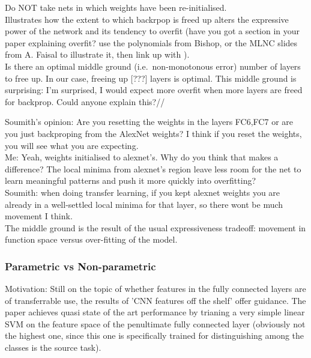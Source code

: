 \documentclass[a4paper,11pt]{article}
\begin{document}
Do NOT take nets in which weights have been re-initialised. \\


Illustrates how the extent to which backrpop is freed up alters the expressive power of the network and its tendency to overfit (have you got a section in your paper explaining overfit? use the polynomials from Bishop, or the MLNC slides from A. Faisal to illustrate it, then link up with ). \\

Is there an optimal middle ground (i.e.\ non-monotonous error) number of layers to free up. In our case, freeing up [???] layers is optimal. This middle ground is surprising: I'm surprised, I would expect more overfit when more layers are freed for backprop. Could anyone explain this?﻿//

Soumith's opinion: Are you resetting the weights in the layers FC6,FC7 or are you just backproping from the AlexNet weights? I think if you reset the weights, you will see what you are expecting.﻿\\
Me: Yeah, weights initialised to alexnet's. Why do you think that makes a difference? The local minima from alexnet's region leave less room for the net to learn meaningful patterns and push it more quickly into overfitting? \\ ﻿
Soumith: when doing transfer learning, if you kept alexnet weights you are already in a well-settled local minima for that layer, so there wont be much movement I think.﻿\\

The middle ground is the result of the usual expressiveness tradeoff: movement in function space versus over-fitting of the model. \\



\subsubsection{Parametric vs Non-parametric}

Motivation:
Still on the topic of whether features in the fully connected layers are of transferrable use, the results of 'CNN features off the shelf' offer guidance. The paper achieves quasi state of the art performance by trianing a very simple linear SVM on the feature space of the penultimate fully connected layer (obviously not the highest one, since this one is specifically trained for distinguishing among the classes is the source task).  
\end{document}
